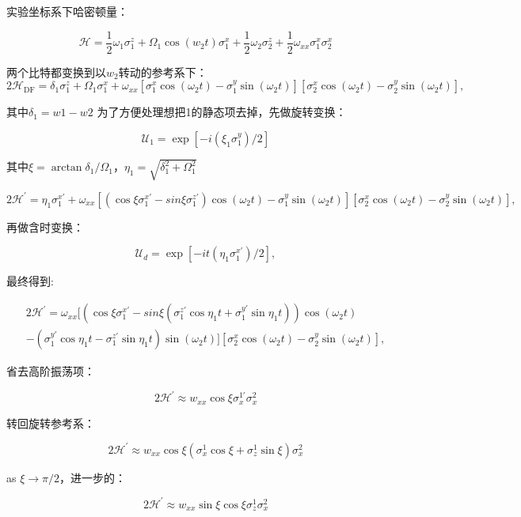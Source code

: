 \documentclass[a4paper]{article}
\begin{document}
实验坐标系下哈密顿量：

$$
\mathcal{H}= 
\frac{1}{2}
 \omega_1 \sigma_1^z
 +\Omega_1 
 \cos \left(w_2 t\right) 
 \sigma_1^x
 +\frac{1}{2} \omega_2 \sigma_2^z
+\frac{1}{2} \omega_{x x} \sigma_1^x \sigma_2^x
$$

两个比特都变换到以$w_2$转动的参考系下：
$$
2 \mathcal{H}_{\mathrm{DF}}= 
 \delta_1 \sigma_1^z
 +\Omega_1 \sigma_1^x
+\omega_{x x}
[\sigma_1^x 
\cos \left(\omega_2 t\right)
-\sigma_1^y \sin \left(
 \omega_2
  t\right)]\left[\sigma_2^x
   \cos \left(\omega_2 t\right)
   -\sigma_2^y \sin \left(
\omega_2 t\right)\right],
$$

其中$\delta_1=w1-w2$
为了方便处理想把1的静态项去掉，先做旋转变换：

$$
\mathcal{U}_1   
=\exp \left[-i\left(\xi_1 \sigma_1^y\right) / 2\right] 
$$

其中$\xi =\arctan \delta_1/\Omega_1$，$\eta_1 =\sqrt{\delta_1^2+\Omega_1^2}$

$$
2 \mathcal{H}^{\prime}= 
 \eta_1 \sigma_1^{x\prime}
+\omega_{x x}
[(\cos\xi \sigma_1^{x\prime}
-sin\xi \sigma_1^{z\prime})\cos \left(\omega_2 t\right)
-\sigma_1^y \sin \left(
 \omega_2
  t\right)]\left[\sigma_2^x
   \cos \left(\omega_2 t\right)
   -\sigma_2^y \sin \left(
\omega_2 t\right)\right],
$$

再做含时变换：

$$
    \mathcal{U}_d 
     =\exp \left[-i t\left(\eta_1 \sigma_1^{x\prime}\right) / 2\right],
$$

最终得到:

$$
\begin{aligned}
  2 \mathcal{H}^{\prime}= 
  \omega_{x x}
  [(\cos\xi \sigma_1^{x\prime}
  -sin\xi 
  (\sigma_1^{z\prime}\cos\eta_1 t+ 
  \sigma_1^{y\prime}\sin\eta_1 t))
  \cos \left(\omega_2 t\right)\\
  -(\sigma_1^{y\prime}\cos\eta_1 t
   - \sigma_1^{z\prime}\sin\eta_1 t) \sin \left(
   \omega_2
    t\right)]\left[\sigma_2^x
     \cos \left(\omega_2 t\right)
     -\sigma_2^y \sin \left(
  \omega_2 t\right)\right],  
\end{aligned}
$$

省去高阶振荡项：

$$
2 \mathcal{H}^{\prime}\approx w_{xx}
\cos \xi \sigma_x^{1\prime}  \sigma_x^{2}
$$

转回旋转参考系：

$$
2 \mathcal{H}^{\prime}\approx w_{xx}
\cos \xi (\sigma_x^{1}\cos\xi 
+\sigma_z^{1}\sin\xi )  \sigma_x^{2}
$$

as $\xi \rightarrow \pi/2$，进一步的：

$$
2 \mathcal{H}^{\prime}\approx w_{xx}\sin\xi
\cos \xi \sigma_z^{1}   \sigma_x^{2}
$$
\end{document}
